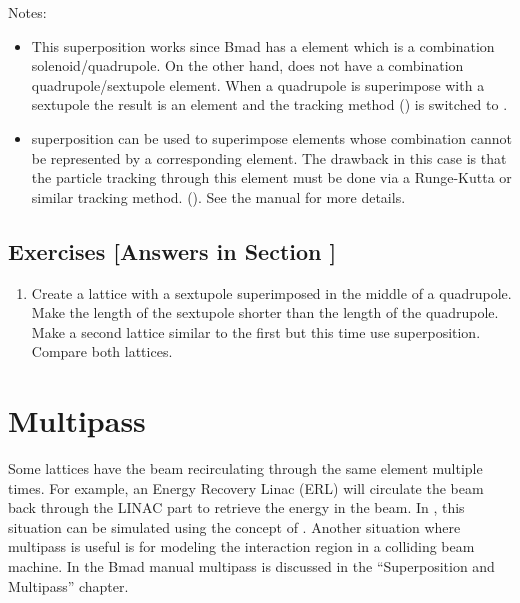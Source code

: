 \documentclass{hitec}     %
\newcommand{\Section}[1]{\section{#1}\vspace*{-1ex}}
\begin{document}
{Notes:
\vspace{-5 pt}
\begin{itemize}
\item 
This superposition works since Bmad has a  element which is a combination
solenoid/quadrupole. On the other hand, \bmad does not have a combination quadrupole/sextupole element.
When a quadrupole is superimpose with a sextupole the result is an  element and the
tracking method () is switched to .
\item
{} superposition can be used to superimpose elements whose combination cannot be
represented by a corresponding \bmad element. The drawback in this case is that the particle
tracking through this element must be done via a Runge-Kutta or similar tracking
method. (). See the \bmad manual for more details.
\end{itemize}

\subsection{Exercises [Answers in Section ]}
\label{s:super.ex}

\begin{enumerate}[label=\thesection.\arabic{enumi}]
\item
Create a lattice with a sextupole superimposed in the middle of a quadrupole. Make the length of the 
sextupole shorter than the length of the quadrupole. Make a second lattice similar to the first but
this time use  superposition. Compare both lattices.
\end{enumerate}

\newpage

\Section{Multipass}
\label{s:multipass}

Some lattices have the beam recirculating through the same element multiple times. For example, an
Energy Recovery Linac (ERL) will circulate the beam back through the LINAC part to retrieve the
energy in the beam. In \bmad, this situation can be simulated using the concept of .
Another situation where multipass is useful is for modeling the interaction region in a colliding
beam machine. In the Bmad manual multipass is discussed in the ``Superposition and Multipass''
chapter.

}
\end{document}
